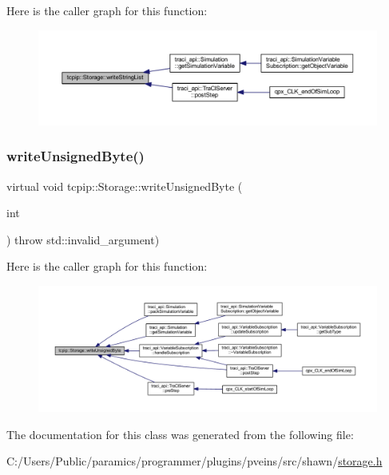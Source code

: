 Here is the caller graph for this function\+:
\nopagebreak
\begin{figure}[H]
\begin{center}
\leavevmode
\includegraphics[width=350pt]{classtcpip_1_1_storage_ac1d5d12f930b3884f3265508f2b43901_icgraph}
\end{center}
\end{figure}
\mbox{\label{classtcpip_1_1_storage_a5a42840a57331704c2fdc30e3d1d2a54}} 
\subsubsection{\texorpdfstring{write\+Unsigned\+Byte()}{writeUnsignedByte()}}
{\footnotesize\ttfamily virtual void tcpip\+::\+Storage\+::write\+Unsigned\+Byte (\begin{DoxyParamCaption}\item[{int}]{ }\end{DoxyParamCaption}) throw  std\+::invalid\+\_\+argument) \hspace{0.3cm}{\ttfamily [virtual]}}

Here is the caller graph for this function\+:
\nopagebreak
\begin{figure}[H]
\begin{center}
\leavevmode
\includegraphics[width=350pt]{classtcpip_1_1_storage_a5a42840a57331704c2fdc30e3d1d2a54_icgraph}
\end{center}
\end{figure}


The documentation for this class was generated from the following file\+:\begin{DoxyCompactItemize}
\item 
C\+:/\+Users/\+Public/paramics/programmer/plugins/pveins/src/shawn/\hyperlink{storage_8h}{storage.\+h}\end{DoxyCompactItemize}
